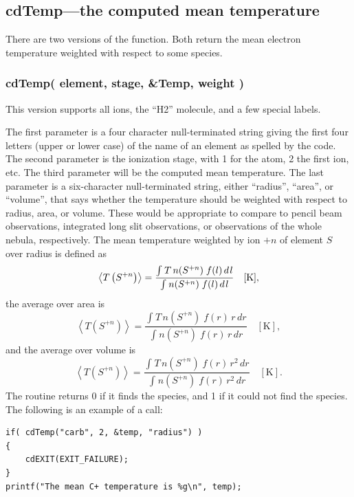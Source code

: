 \subsection{cdTemp---the computed mean temperature}
\label{sec:SubroutineCdTemp}

There are two versions of the  function.
Both return the mean electron temperature weighted with respect
to some species.

\subsubsection{cdTemp( element, stage, \&Temp, weight )}

This version supports all ions, the ``H2'' molecule, and a few special labels.

The first parameter is a four character null-terminated
string giving the first four letters (upper or lower case) of the name of
an element as spelled by the code.
The second parameter is the ionization
stage, with 1 for the atom, 2 the first ion, etc.
The third parameter will
be the computed mean temperature.
The last parameter is a six-character
null-terminated string, either ``radius'', ``area'', or ``volume'', that says whether
the temperature should be weighted with respect to radius, area, or volume.
These would be appropriate to compare to pencil beam observations,
integrated long slit observations, or observations of the whole nebula, respectively.
The mean temperature weighted by ion $+n$ of element $S$ over radius
is defined as
\begin{equation}
\left\langle {T\left( {{S^{ + n}}} \right)} \right\rangle  =
\frac{{\int_{}^{} {T\,n({S^{ + n}})\;f(l)\,d{\kern 1pt} l} }}{{\int_{}^{}
{n({S^{ + n}})\;f(l)\,d{\kern 1pt} l} }}\quad [\mathrm{K}],
\end{equation}
the average over area is
\begin{equation}
\left\langle {T\left( {{S^{ + n}}} \right)} \right\rangle  =
\frac{{\int_{}^{} {T\,n({S^{ + n}})\;f(r)\,r\,dr} }}{{\int_{}^{} {n({S^{ +
n}})\;f(r)\,r\,dr} }}
\quad [\mathrm{K}],
\end{equation}
and the average over volume  is
\begin{equation}
\left\langle {T\left( {{S^{ + n}}} \right)} \right\rangle  =
\frac{{\int_{}^{} {T\,n({S^{ + n}})\;f(r)\,r^2\,dr} }}{{\int_{}^{} {n({S^{ +
n}})\;f(r)\,r^2\,dr} }}
\quad [\mathrm{K}] .
\end{equation}
The routine returns 0 if it finds the species, and 1 if it could not find
the species.  The following is an example of a call:
\begin{verbatim}
if( cdTemp("carb", 2, &temp, "radius") )
{
    cdEXIT(EXIT_FAILURE);
}
printf("The mean C+ temperature is %g\n", temp);
\end{verbatim}

